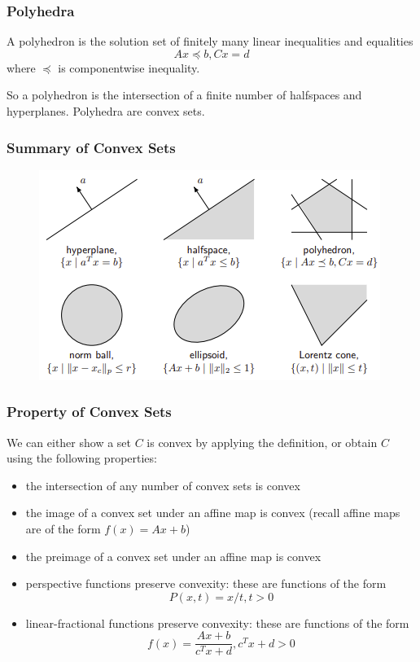 \documentclass[11pt]{article}
\begin{document}
\subsubsection*{Polyhedra} 
A polyhedron is the solution set of finitely many linear inequalities and equalities 
\[ Ax \preceq b, Cx = d \] 
where $\preceq$ is componentwise inequality. \par 
So a polyhedron is the intersection of a finite number of halfspaces and hyperplanes. 
Polyhedra are convex sets. 

\subsubsection*{Summary of Convex Sets} 
\begin{figure}[H]
    \centering
    \includegraphics{images/2.1}
\end{figure}

\subsubsection*{Property of Convex Sets} 
We can either show a set $C$ is convex by applying the definition, or obtain $C$ using the following properties: 
\begin{itemize}
    \item the intersection of any number of convex sets is convex 
    \item the image of a convex set under an affine map is convex (recall affine maps are of the form $f(x) = Ax + b$)
    \item the preimage of a convex set under an affine map is convex
    \item perspective functions preserve convexity: these are functions of the form 
    \[ P(x, t) = x/t, t > 0 \] 
    \item linear-fractional functions preserve convexity: these are functions of the form 
    \[ f(x) = \frac{Ax + b}{c^Tx + d}, c^Tx + d > 0 \]     
\end{itemize}
\end{document}
